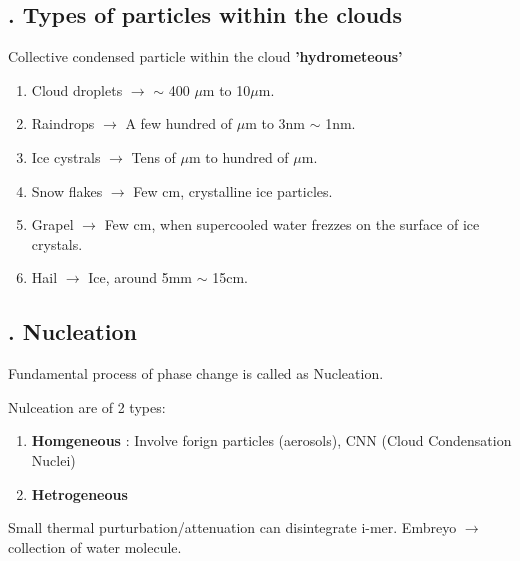 \documentclass[fleqn,10pt]{SelfArx} %
\begin{document}

\subsection{. Types of particles within the clouds}
Collective condensed particle within the cloud \textbf{'hydrometeous'}
\begin{enumerate}[noitemsep]
    \item Cloud droplets $\rightarrow$ $\sim$ 400 $\mu$m to 10$\mu$m.
    \item Raindrops $\rightarrow$ A few hundred of $\mu$m to 3nm $\sim$ 1nm.
    \item Ice cystrals $\rightarrow$ Tens of $\mu$m to hundred of $\mu$m.
    \item Snow flakes $\rightarrow$ Few cm, crystalline ice particles.
    \item Grapel $\rightarrow$ Few cm, when supercooled water frezzes on the surface of ice crystals.
    \item Hail $\rightarrow$ Ice, around 5mm $\sim$ 15cm.
\end{enumerate}

\subsection{. Nucleation}
Fundamental process of phase change is called as Nucleation.

Nulceation are of 2 types:
\begin{enumerate}[noitemsep]
    \item \textbf{Homgeneous} : Involve forign particles (aerosols), CNN (Cloud Condensation Nuclei)
    \item \textbf{Hetrogeneous}
\end{enumerate}
Small thermal purturbation/attenuation can disintegrate i-mer.
Embreyo $\rightarrow$ collection of water molecule.
\end{document}
